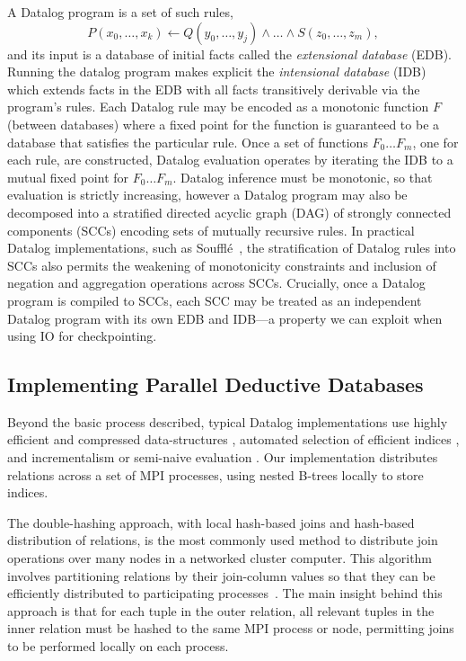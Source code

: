 A Datalog program is a set of such rules,
%
\[ P(x_0,\ldots,x_k) \leftarrow Q(y_0,\ldots,y_j) \wedge \ldots \wedge S(z_0,\ldots,z_m), \]
%
and its input is a database of initial facts called the \emph{extensional database} (EDB). Running the datalog program makes explicit the \emph{intensional database} (IDB) which extends facts in the EDB with all facts transitively derivable via the program's rules.
%
Each Datalog rule may be encoded as a monotonic function $F$ (between databases) where a fixed point for the function is guaranteed to be a database that satisfies the particular rule. Once a set of functions $F_0 \ldots F_m$, one for each rule, are constructed, Datalog evaluation operates by iterating the IDB to a mutual fixed point for $F_0 \ldots F_m$.
%
Datalog inference must be monotonic, so that evaluation is strictly increasing, however a Datalog program may also be decomposed into a stratified directed acyclic graph (DAG) of strongly connected components (SCCs) encoding sets of mutually recursive rules. In practical Datalog implementations, such as Souffl\'e~\cite{Scholz:2016:FLP:2892208.2892226, 10.1007/978-3-319-41540-6}, the stratification of Datalog rules into SCCs also permits the weakening of monotonicity constraints and inclusion of negation and aggregation operations across SCCs. Crucially, once a Datalog program is compiled to SCCs, each SCC may be treated as an independent Datalog program with its own EDB and IDB---a property we can exploit when using IO for checkpointing.

\subsection{Implementing Parallel Deductive Databases}
%
Beyond the basic process described, typical Datalog implementations use highly efficient and compressed data-structures \cite{brie-pmam, btree-ppopp}, automated selection of efficient indices \cite{Subotic:2018:AIS:3282495.3302538}, and incrementalism or semi-naive evaluation \cite{abiteboul1995foundations}. Our implementation distributes relations across a set of MPI processes, using nested B-trees locally to store indices.

The double-hashing approach, with local hash-based joins and hash-based distribution of relations, is the most commonly used method to distribute join operations over many nodes in a networked cluster computer. This algorithm involves partitioning relations by their join-column values so that they can be efficiently distributed to participating processes~\cite{%
  Cheiney:1990:PST:94362.94445, Cacace:1991:OPS:111828.111831}. The main insight behind this approach is that for each tuple in the outer relation, all relevant tuples in the inner relation must be hashed to the same MPI process or node, permitting joins to be performed locally on each process.

